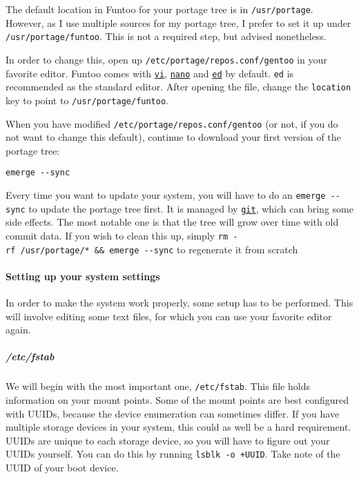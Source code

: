 The default location in Funtoo for your portage tree is in
\texttt{/usr/portage}. However, as I use multiple sources for my portage
tree, I prefer to set it up under \texttt{/usr/portage/funtoo}. This is
not a required step, but advised nonetheless.

In order to change this, open up \texttt{/etc/portage/repos.conf/gentoo}
in your favorite editor. Funtoo comes with
\href{https://en.wikipedia.org/wiki/Vi}{\texttt{vi}},
\href{https://en.wikipedia.org/wiki/GNU_nano}{\texttt{nano}} and
\href{https://en.wikipedia.org/wiki/Ed_(text_editor)}{\texttt{ed}} by
default. \texttt{ed} is recommended as the standard editor. After
opening the file, change the \texttt{location} key to point to
\texttt{/usr/portage/funtoo}.

When you have modified \texttt{/etc/portage/repos.conf/gentoo} (or not,
if you do not want to change this default), continue to download your
first version of the portage tree:

\begin{verbatim}
emerge --sync
\end{verbatim}

Every time you want to update your system, you will have to do an
\texttt{emerge\ -\/-sync} to update the portage tree first. It is
managed by \href{https://en.wikipedia.org/wiki/Git}{\texttt{git}}, which
can bring some side effects. The most notable one is that the tree will
grow over time with old commit data. If you wish to clean this up,
simply \texttt{rm\ -rf\ /usr/portage/*\ \&\&\ emerge\ -\/-sync} to
regenerate it from scratch

\paragraph{Setting up your system
settings}\label{setting-up-your-system-settings}

In order to make the system work properly, some setup has to be
performed. This will involve editing some text files, for which you can
use your favorite editor again.

\subparagraph{/etc/fstab}\label{etcfstab}

We will begin with the most important one, \texttt{/etc/fstab}. This
file holds information on your mount points. Some of the mount points
are best configured with UUIDs, because the device enumeration can
sometimes differ. If you have multiple storage devices in your system,
this could as well be a hard requirement. UUIDs are unique to each
storage device, so you will have to figure out your UUIDs yourself. You
can do this by running \texttt{lsblk\ -o\ +UUID}. Take note of the UUID
of your boot device.

